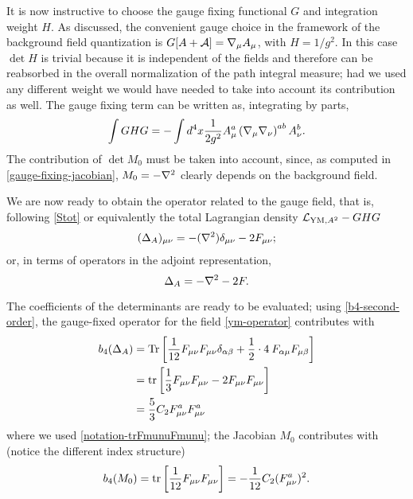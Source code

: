 It is now instructive to choose the gauge fixing functional $G$ and integration weight $H$.   As discussed, the convenient gauge choice in the framework of the background field quantization is
\(
{G}[A + \mathcal{A}] = { \mathcal{\nabla} }_\mu A_\mu
\),
with $H=  1/g^2.$ In this case \( \det H \) is trivial because it is independent of the fields and therefore can be reabsorbed in the overall normalization of the path integral measure; had we used any different weight we would have needed to take into account its contribution as well. The gauge fixing term can be written as, integrating by parts,
\begin{equation}
\int {G} H {G}
	=
- \int d^4x \frac{1}{2g^2} A_\mu^a \left( { \mathcal{\nabla} }_\mu { \mathcal{\nabla} }_\nu \right)^{ab} A^b_\nu.
\end{equation}
The contribution of $\det M_0$ must be taken into account, since, as computed in \eqref{gauge-fixing-jacobian}, $M_0= - { \mathcal{\nabla} }^2$ clearly depends on the background field.


We are now ready to obtain the operator related to the gauge field, that is, following \eqref{Stot} or equivalently the total Lagrangian density \( { \mathcal{L} }_{{ \text{YM} },A^2} - GHG \)
\begin{align}\label{ym-operator-ecplicit}
(\Delta_A)_{\mu\nu}  = 	 	
  	- ({ \mathcal{\nabla} }^2) \delta_{\mu\nu}  
  	- 2 F_{\mu\nu} ;
\end{align}
or, in terms of operators in the adjoint representation,
\begin{equation}\label{ym-operator}
\Delta_A =
  	- { \mathcal{\nabla} }^2
	- 2 F  .
\end{equation}

The coefficients of the determinants are ready to be evaluated; using \eqref{b4-second-order}, the gauge-fixed operator for the \ym{} field \eqref{ym-operator} contributes with
\begin{equation}\label{b4-ym-operator}
\begin{split}
b_4( \Delta_A ) 
& = 
\operatorname{Tr} \left[ \frac{1}{12} F_{\mu\nu} F_{\mu\nu} \delta_{\alpha \beta} + \frac{1}{2} \cdot 4 \:  F_{\alpha\mu} F_{\mu \beta} \right]  
\\
& = 
\operatorname{tr} \left[ \frac{1}{3} F_{\mu\nu} F_{\mu\nu} - 2  F_{\mu\nu} F_{\mu \nu} \right]
\\
&
= \frac{5}{3} C_2 F^a_{ \mu \nu }F^a_{ \mu \nu }
\end{split}
\end{equation}
where we used \eqref{notation-trFmunuFmunu}; the Jacobian $M_0$ contributes with (notice the different index structure)
\begin{equation}\label{b4-M0-operator}
b_4( M_0 )  =  \operatorname{tr} \left[ \frac{1}{12} F_{\mu\nu} F_{\mu\nu} \right] = - \frac{1}{12} C_2 ( F^a_{ \mu \nu } )^2 .
\end{equation}


